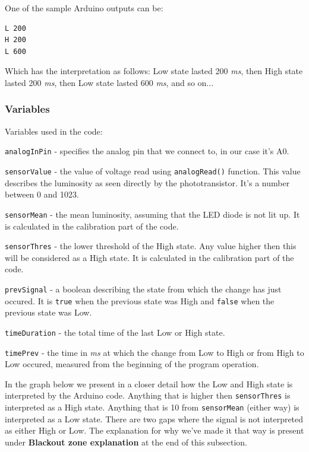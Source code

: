 \documentclass[12pt]{report}
\begin{document}
One of the sample Arduino outputs can be:

\begin{snugshade}
\begin{verbatim}
L 200
H 200
L 600
\end{verbatim}
\end{snugshade}

Which has the interpretation as follows: Low state lasted 200 \textit{ms}, then High state lasted 200 \textit{ms}, then Low state lasted 600 \textit{ms}, and so on...




\subsubsection{Variables}

Variables used in the code:

\verb|analogInPin| - specifies the analog pin that we connect to, in our case it's A0.

\verb|sensorValue| - the value of voltage read using \verb|analogRead()| function. This value describes the luminosity as seen directly by the phototransistor. It's a number between 0 and 1023.

\verb|sensorMean| - the mean luminosity, assuming that the LED diode is not lit up. It is calculated in the calibration part of the code.

\verb|sensorThres| - the lower threshold of the High state. Any value higher then this will be considered as a High state. It is calculated in the calibration part of the code.

\verb|prevSignal| - a boolean describing the state from which the change has just occured. It is \verb|true| when the previous state was High and \verb|false| when the previous state was Low.

\verb|timeDuration| - the total time of the last Low or High state.

\verb|timePrev| - the time in \textit{ms} at which the change from Low to High or from High to Low occured, measured from the beginning of the program operation.

In the graph below we present in a closer detail how the Low and High state is interpreted by the Arduino code. Anything that is higher then \verb|sensorThres| is interpreted as a High state. Anything that is 10 from \verb|sensorMean| (either way) is interpreted as a Low state. There are two gaps where the signal is not interpreted as either High or Low. The explanation for why we've made it that way is present under \textbf{Blackout zone explanation} at the end of this subsection.
\end{document}
